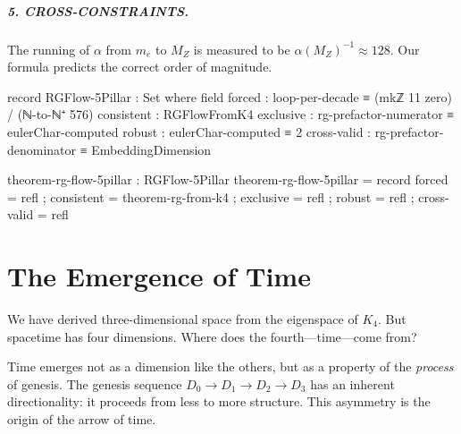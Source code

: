 \documentclass[11pt,a4paper]{book}
\begin{document}
\paragraph{5. CROSS-CONSTRAINTS.} The running of $\alpha$ from $m_e$ to $M_Z$ is measured to be $\alpha(M_Z)^{-1} \approx 128$. Our formula predicts the correct order of magnitude.

\begin{code}
record RGFlow-5Pillar : Set where
  field
    forced       : loop-per-decade ≡ (mkℤ 11 zero) / (ℕ-to-ℕ⁺ 576)
    consistent   : RGFlowFromK4
    exclusive    : rg-prefactor-numerator ≡ eulerChar-computed
    robust       : eulerChar-computed ≡ 2
    cross-valid  : rg-prefactor-denominator ≡ EmbeddingDimension

theorem-rg-flow-5pillar : RGFlow-5Pillar
theorem-rg-flow-5pillar = record
  { forced      = refl
  ; consistent  = theorem-rg-from-k4
  ; exclusive   = refl
  ; robust      = refl
  ; cross-valid = refl
  }
\end{code}

\chapter{The Emergence of Time}
\label{chap:emergence-time}

We have derived three-dimensional space from the eigenspace of $K_4$. But spacetime has 
four dimensions. Where does the fourth—time—come from?

Time emerges not as a dimension like the others, but as a property of the \emph{process} 
of genesis. The genesis sequence $D_0 \to D_1 \to D_2 \to D_3$ has an inherent directionality: 
it proceeds from less to more structure. This asymmetry is the origin of the arrow of time.
\end{document}
